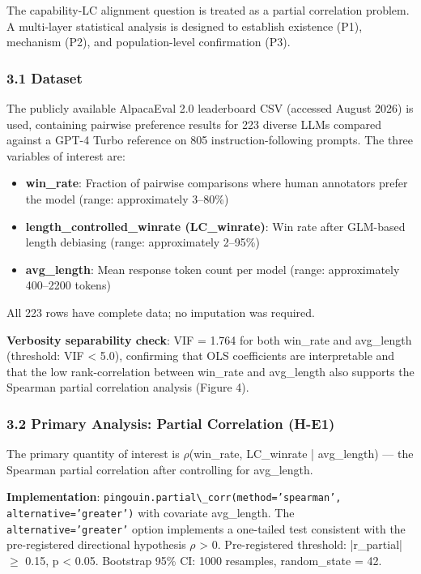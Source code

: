 
The capability-LC alignment question is treated as a partial correlation problem. A multi-layer statistical analysis is designed to establish existence (P1), mechanism (P2), and population-level confirmation (P3).

\subsubsection{3.1 Dataset}

The publicly available AlpacaEval 2.0 leaderboard CSV (accessed August 2026) is used, containing pairwise preference results for 223 diverse LLMs compared against a GPT-4 Turbo reference on 805 instruction-following prompts. The three variables of interest are:

\begin{itemize}
\item \textbf{win\_rate}: Fraction of pairwise comparisons where human annotators prefer the model (range: approximately 3--80\%)
\item \textbf{length\_controlled\_winrate (LC\_winrate)}: Win rate after GLM-based length debiasing \citep{Dubois2024LengthControlled} (range: approximately 2--95\%)
\item \textbf{avg\_length}: Mean response token count per model (range: approximately 400--2200 tokens)
\end{itemize}

All 223 rows have complete data; no imputation was required.

\textbf{Verbosity separability check}: VIF = 1.764 for both win\_rate and avg\_length (threshold: VIF < 5.0), confirming that OLS coefficients are interpretable and that the low rank-correlation between win\_rate and avg\_length also supports the Spearman partial correlation analysis (Figure 4).

\subsubsection{3.2 Primary Analysis: Partial Correlation (H-E1)}

The primary quantity of interest is $\rho$(win\_rate, LC\_winrate | avg\_length) --- the Spearman partial correlation after controlling for avg\_length.

\textbf{Implementation}: \texttt{pingouin.partial\textbackslash \_corr(method='spearman', alternative='greater')} with covariate avg\_length. The \texttt{alternative='greater'} option implements a one-tailed test consistent with the pre-registered directional hypothesis $\rho$ > 0. Pre-registered threshold: |r\_partial| $\geq$ 0.15, p < 0.05. Bootstrap 95\% CI: 1000 resamples, random\_state = 42.

